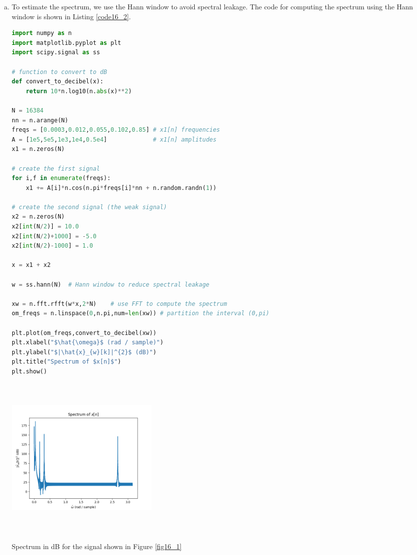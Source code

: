 \begin{enumerate}
\begin{enumerate}[a)]
\item To estimate the spectrum, we use the Hann window to avoid spectral leakage. The code for computing the spectrum using the Hann window is shown in Listing \ref{code16_2}.

\begin{lstlisting}[language=Python, caption=Spectrum for noisy signal in Figure \ref{fig16_1},label=code16_2]
import numpy as n
import matplotlib.pyplot as plt
import scipy.signal as ss

# function to convert to dB
def convert_to_decibel(x):
    return 10*n.log10(n.abs(x)**2)
    
N = 16384
nn = n.arange(N)
freqs = [0.0003,0.012,0.055,0.102,0.85] # x1[n] frequencies
A = [1e5,5e5,1e3,1e4,0.5e4]             # x1[n] amplitudes
x1 = n.zeros(N)

# create the first signal
for i,f in enumerate(freqs):
    x1 += A[i]*n.cos(n.pi*freqs[i]*nn + n.random.randn(1))

# create the second signal (the weak signal)
x2 = n.zeros(N)
x2[int(N/2)] = 10.0
x2[int(N/2)+1000] = -5.0
x2[int(N/2)-1000] = 1.0

x = x1 + x2

w = ss.hann(N)  # Hann window to reduce spectral leakage

xw = n.fft.rfft(w*x,2*N)    # use FFT to compute the spectrum
om_freqs = n.linspace(0,n.pi,num=len(xw)) # partition the interval (0,pi)

plt.plot(om_freqs,convert_to_decibel(xw))
plt.xlabel("$\hat{\omega}$ (rad / sample)")
plt.ylabel("$|\hat{x}_{w}[k]|^{2}$ (dB)")
plt.title("Spectrum of $x[n]$")
plt.show()
\end{lstlisting}

\begin{marginfigure}
    \centering
    \includegraphics[width=7.5cm,height=8.0cm]{ch17/figures/ex16_2.png}
    \caption{Spectrum in dB for the signal shown in Figure \ref{fig16_1}}
    \label{fig16_2}
\end{marginfigure}


\end{enumerate}
\end{enumerate}
